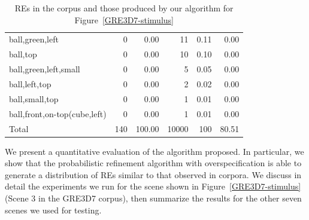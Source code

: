 \begin{table}[!t]
\begin{small}
\begin{center}
\begin{tabular}{|l|r|r|r|r|r|}
ball,green,left	                              &  0 &  0.00 &   11 &  0.11 &  0.00\\
ball,top                                      &  0 &  0.00 &   10 &  0.10 &  0.00\\
ball,green,left,small                         &  0 &  0.00 &    5 &  0.05 &  0.00\\
ball,left,top                                 &  0 &  0.00 &    2 &  0.02 &  0.00\\
ball,small,top                                &  0 &  0.00 &    1 &  0.01 &  0.00\\
ball,front,on-top(cube,left)                  &  0 &  0.00 &    1 &  0.01 &  0.00\\
\hline
Total & 140 & 100.00 & 10000 & 100 & 80.51 \\
\hline
\end{tabular}
\caption{REs in the corpus and those produced by our algorithm for Figure~\ref{GRE3D7-stimulus}\label{results-algo-fig3}}
\vspace*{-.5cm}
\end{center}
\end{small}
\end{table}

We present a quantitative evaluation of the algorithm proposed. 
In particular, we show that the probabilistic refinement algorithm with overspecification is able to generate a distribution of REs similar to that observed in corpora.
We discuss in detail the experiments we run for the scene shown in Figure~\ref{GRE3D7-stimulus} (Scene 3 in the GRE3D7 corpus), then summarize the results for the other seven scenes we used for testing. 


